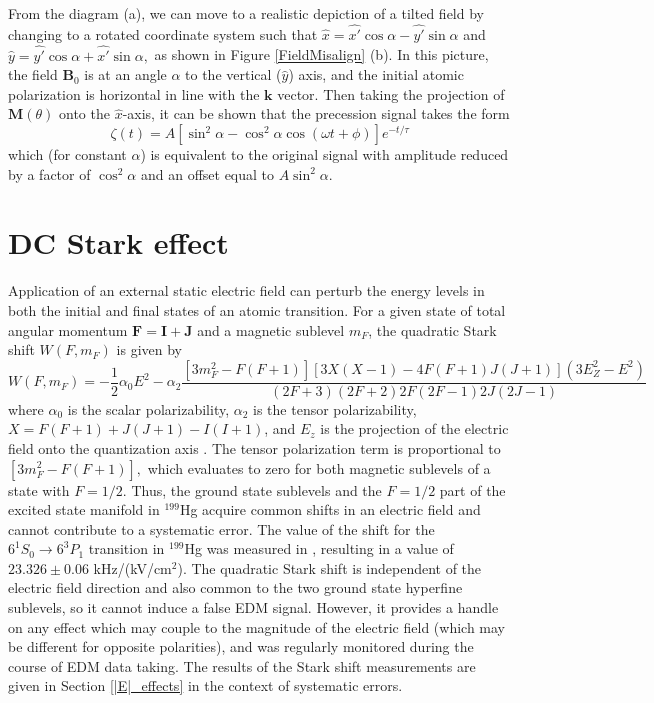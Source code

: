 \documentclass [10pt, twoside] {uwthesis}[2012/04/02]
\begin{document}
From the diagram (a), we can move to a realistic depiction of a tilted field by changing to a rotated coordinate system such that $\hat{x} = \hat{x'}\cos\alpha - \hat{y'}\sin\alpha$ and $\hat{y} = \hat{y'}\cos\alpha + \hat{x'}\sin\alpha,$ as shown in Figure \ref{FieldMisalign} (b). In this picture, the field $\mathbf{B}_0$ is at an angle $\alpha$ to the vertical ($\hat{y}$) axis, and the initial atomic polarization is horizontal in line with the $\mathbf{k}$ vector. Then taking the projection of $\mathbf{M}(\theta)$ onto the $\hat{x}$-axis, it can be shown that the precession signal takes the form
\begin{equation}
\zeta(t) = A[\sin^2\alpha - \cos^2\alpha\cos(\omega t + \phi)] e^{-t/\tau}
\end{equation}
which (for constant $\alpha$) is equivalent to the original signal with amplitude reduced by a factor of $\cos^2\alpha$ and an offset equal to $A\sin^2\alpha.$

\section{DC Stark effect}
Application of an external static electric field can perturb the energy levels in both the initial and final states of an atomic transition. For a given state of total angular momentum $\mathbf{F} = \mathbf{I} +\mathbf{J}$ and a magnetic sublevel $m_F$, the quadratic Stark shift $W(F,m_F)$ is given by
\begin{equation}
W(F,m_F) = -\frac{1}{2}\alpha_0 E^2 - \alpha_2 \dfrac{[3m^2_F-F(F+1)][3X(X-1)-4F(F+1)J(J+1)](3E_Z^2-E^2)}{(2F+3)(2F+2)2F(2F-1)2J(2J-1)}
\end{equation}
where $\alpha_0$ is the scalar polarizability, $\alpha_2$ is the tensor polarizability, $X=F(F+1)+J(J+1)-I(I+1)$, and $E_z$ is the projection of the electric field onto the quantization axis \cite{Stark_Shift_expression}. The tensor polarization term is proportional to $[3m^2_F-F(F+1)],$ which evaluates to zero for both magnetic sublevels of a state with $F=1/2$. Thus, the ground state sublevels and the $F=1/2$ part of the excited state manifold in $^{199}$Hg acquire common shifts in an electric field and cannot contribute to a systematic error. The value of the shift for the $6^1S_0 \rightarrow 6 ^3P_1$ transition in $^{199}$Hg was measured in \cite{2000_Hg_Stark_Shift}, resulting in a value of $23.326 \pm 0.06$ kHz/(kV/cm$^2$). The quadratic Stark shift is independent of the electric field direction and also common to the two ground state hyperfine sublevels, so it cannot induce a false EDM signal. However, it provides a handle on any effect which may couple to the magnitude of the electric field (which may be different for opposite polarities), and was regularly monitored during the course of EDM data taking. The results of the Stark shift measurements are given in Section \ref{|E|_effects} in the context of systematic errors.
\end{document}
